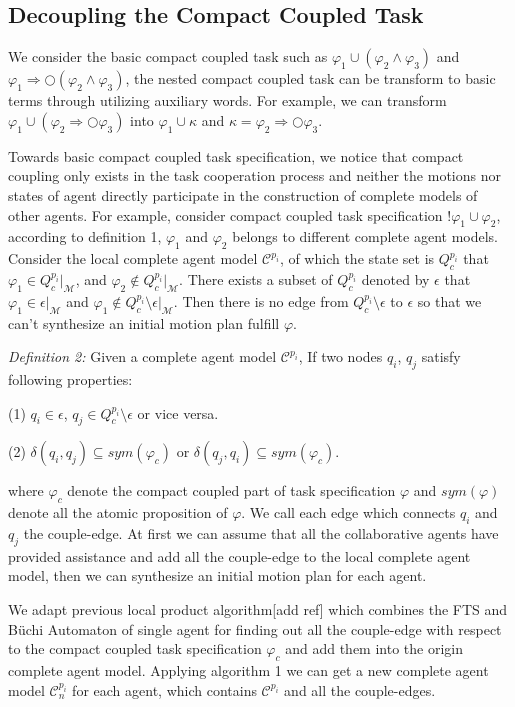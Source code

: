 \documentclass[journal]{IEEEtran}
\begin{document}
\subsection{Decoupling the Compact Coupled Task}
We consider the basic compact coupled task such as $\varphi_1 \cup (\varphi_2 \wedge \varphi_3)$ and $\varphi_1 \Longrightarrow \bigcirc(\varphi_2 \wedge \varphi_3)$, the nested compact coupled task can be transform to basic terms through utilizing auxiliary words. For example, we can transform $\varphi_1 \cup (\varphi_2 \Longrightarrow \bigcirc \varphi_3)$ into $\varphi_1 \cup \kappa$ and $\kappa=\varphi_2 \Longrightarrow \bigcirc \varphi_3$.
\par
Towards basic compact coupled task specification, we notice that compact coupling only exists in the task cooperation process and neither the motions nor states of agent directly participate in the construction of complete models of other agents. For example, consider compact coupled task specification $!\varphi_1\cup\varphi_2$, according to definition 1, $\varphi_1$ and $\varphi_2$ belongs to different complete agent models. Consider the local complete agent model $\mathcal{C}^{p_i}$, of which the state set is $Q_c^{p_i}$ that $\varphi_1 \in Q_c^{p_i}|_{\mathcal{M}}$, and $\varphi_2 \notin Q_c^{p_i}|_{\mathcal{M}} $. There exists a subset of $Q_c^{p_i}$ denoted by $\epsilon$ that $\varphi_1 \in \epsilon |_{\mathcal{M}}$ and $\varphi_1 \notin Q_c^{p_i} \setminus \epsilon |_{\mathcal{M}}$. Then there is no edge from $Q_c^{p_i} \setminus \epsilon$ to $\epsilon$ so that we can't synthesize an initial motion plan fulfill $\varphi$.\par
\emph{Definition 2:} Given a complete agent model $\mathcal{C}^{p_i}$, If two nodes $q_i$, $q_j$ satisfy following properties:
\par
(1) $q_i \in \epsilon$, $q_j \in Q_c^{p_i} \setminus \epsilon$ or vice versa.\par
(2) $\delta(q_i,q_j)\subseteq sym(\varphi_c)$ or $\delta(q_j,q_i)\subseteq sym(\varphi_c)$.\par
where $\varphi_c$ denote the compact coupled part of task specification $\varphi$ and $sym(\varphi)$ denote all the atomic proposition of $\varphi$.
We call each edge which connects $q_i$ and $q_j$ the couple-edge.
At first we can assume that all the collaborative agents have provided assistance and add all the couple-edge to the local complete agent model, then we can synthesize an initial motion plan for each agent.\par
We adapt previous local product algorithm[add ref] which combines the FTS and B\"{u}chi Automaton of single agent for finding out all the couple-edge with respect to the compact coupled task specification $\varphi_c$ and add them into the origin complete agent model. Applying algorithm 1 we can get a new complete agent model $\mathcal{C}^{p_i}_n$ for each agent, which contains $\mathcal{C}^{p_i}$ and all the couple-edges.\par
\end{document}
